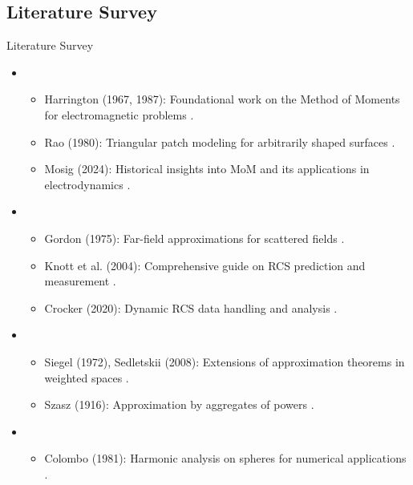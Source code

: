 \subsection{Literature Survey}
\begin{frame}[ allowframebreaks ]{Literature Survey}
    \begin{itemize}
        \item {}
            \begin{itemize}
                \item Harrington (1967, 1987): Foundational work on the Method of Moments for electromagnetic problems \cite{harrington1967matrix, harrington1987method}.
                \item Rao (1980): Triangular patch modeling for arbitrarily shaped surfaces \cite{rao1980electromagnetic}.
                \item Mosig (2024): Historical insights into MoM and its applications in electrodynamics \cite{10460331}.
            \end{itemize}
        \item {}
            \begin{itemize}
                \item Gordon (1975): Far-field approximations for scattered fields \cite{gordon1975far}.
                \item Knott et al. (2004): Comprehensive guide on RCS prediction and measurement \cite{knott2004radar}.
                \item Crocker (2020): Dynamic RCS data handling and analysis \cite{osti_1664641}.
            \end{itemize}
        \item {}
            \begin{itemize}
                \item Siegel (1972), Sedletskii (2008): Extensions of approximation theorems in weighted spaces \cite{siegel1972muntz, sedletskii2008approximation}.
                \item Szasz (1916): Approximation by aggregates of powers \cite{szasz1916approximation}.
            \end{itemize}
        \item {}
            \begin{itemize}
                \item Colombo (1981): Harmonic analysis on spheres for numerical applications \cite{colombo1981numerical}.

\end{itemize}
\end{itemize}
\end{frame}
